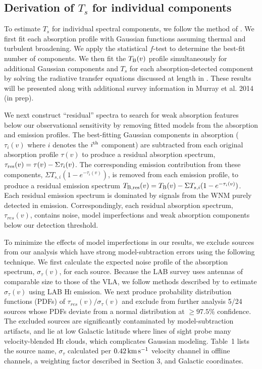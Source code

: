 \documentclass{aastex}
\begin{document}
\subsection{Derivation of $T_s$ for individual components}

To estimate $T_s$ for 
individual spectral components, we follow the method of \citet{HT031}.
We first fit each absorption profile with Gaussian functions 
assuming thermal and turbulent broadening. We apply the 
statistical $f$-test to determine the best-fit number of 
components.  
We then fit the $T_{\rm B}(v)$ profile simultaneously for
additional Gaussian components and $T_s$ for each absorption-detected 
component by solving the radiative transfer equations discussed at length in
\citet{HT031}.  These results will be presented along with 
additional survey information in Murray et al. 2014 (in prep).

We next construct ``residual'' spectra to search for weak absorption features 
below our observational sensitivity by removing fitted models 
from the absorption and emission profiles.
The best-fitting Gaussian components in absorption
($\tau_{i}(v)$ where $i$ denotes the $i^{\rm th}$ 
component) are subtracted from each original absorption profile $\tau(v)$ to produce a residual absorption spectrum,
$\tau_{\rm res} (v)= \tau(v) - \Sigma \tau_{i}(v)$.
The corresponding emission contribution from these components,
$\Sigma T_{s,i} (1-e^{-\tau_{i}(v)})$,
is removed from each emission profile, to produce a residual 
emission spectrum $T_{\rm B,res}(v) = T_{\rm B}(v) - \Sigma T_{s,i} (1-e^{-\tau_{i}(v)})$.
Each residual emission spectrum is dominated by signals from the WNM purely detected in emission.
Correspondingly, each residual absorption spectrum, $\tau_{res}(v)$,
contains noise, model imperfections and weak absorption
components below our detection threshold.

To minimize the effects of model imperfections in our results, we
exclude sources from our analysis which have strong
model-subtraction errors using the following technique.  We first
calculate the expected noise profile of the absorption spectrum,
 $\sigma_{\tau} (v)$, for each source.  Because the LAB survey
uses antennas of comparable size to those of the VLA, we follow methods
described by \citet{Roy13one} to estimate $\sigma_{\tau} (v)$ using
LAB H\textsc{i} emission.
We next  produce probability distribution functions
(PDFs) of $\tau_{res}(v)/\sigma_{\tau} (v)$ and  exclude from 
further analysis 5/24 sources whose PDFs deviate from a normal distribution at
$\geq97.5$\% confidence.
The excluded sources are significantly
contaminated by model-subtraction artifacts, and lie at
low Galactic latitude where lines of sight probe many
velocity-blended H\textsc{i} clouds, which complicates
Gaussian modeling. Table~1 lists the source name, $\sigma_{\tau}$
calculated per $0.42\rm\,km\,s^{-1}$ velocity channel in offline channels,
a weighting factor described in Section 3, and Galactic coordinates.
\end{document}
